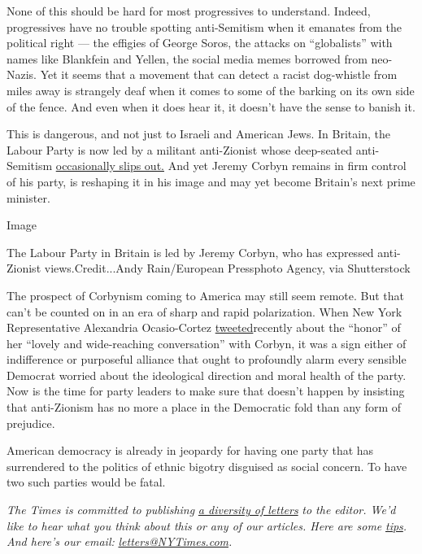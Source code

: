 None of this should be hard for most progressives to understand. Indeed,
progressives have no trouble spotting anti-Semitism when it emanates
from the political right --- the effigies of George Soros, the attacks
on ``globalists'' with names like Blankfein and Yellen, the social media
memes borrowed from neo-Nazis. Yet it seems that a movement that can
detect a racist dog-whistle from miles away is strangely deaf when it
comes to some of the barking on its own side of the fence. And even when
it does hear it, it doesn't have the sense to banish it.

This is dangerous, and not just to Israeli and American Jews. In
Britain, the Labour Party is now led by a militant anti-Zionist whose
deep-seated anti-Semitism
\href{https://www.nytimes3xbfgragh.onion/2018/08/27/opinion/jeremy-corbyn-anti-semitism-labour-britain.html}{occasionally
slips out.} And yet Jeremy Corbyn remains in firm control of his party,
is reshaping it in his image and may yet become Britain's next prime
minister.

Image

The Labour Party in Britain is led by Jeremy Corbyn, who has expressed
anti-Zionist views.Credit...Andy Rain/European Pressphoto Agency, via
Shutterstock

The prospect of Corbynism coming to America may still seem remote. But
that can't be counted on in an era of sharp and rapid polarization. When
New York Representative Alexandria Ocasio-Cortez
\href{https://twitter.com/AOC/status/1092210825228636161}{tweeted}recently
about the ``honor'' of her ``lovely and wide-reaching conversation''
with Corbyn, it was a sign either of indifference or purposeful alliance
that ought to profoundly alarm every sensible Democrat worried about the
ideological direction and moral health of the party. Now is the time for
party leaders to make sure that doesn't happen by insisting that
anti-Zionism has no more a place in the Democratic fold than any form of
prejudice.

American democracy is already in jeopardy for having one party that has
surrendered to the politics of ethnic bigotry disguised as social
concern. To have two such parties would be fatal.

\emph{The Times is committed to publishing}
\href{https://www.nytimes3xbfgragh.onion/2019/01/31/opinion/letters/letters-to-editor-new-york-times-women.html}{\emph{a
diversity of letters}} \emph{to the editor. We'd like to hear what you
think about this or any of our articles. Here are some}
\href{https://help.nytimes3xbfgragh.onion/hc/en-us/articles/115014925288-How-to-submit-a-letter-to-the-editor}{\emph{tips}}\emph{.
And here's our email:}
\href{mailto:letters@NYTimes.com}{\emph{letters@NYTimes.com}}\emph{.}

